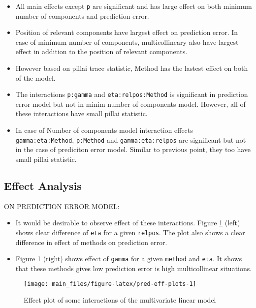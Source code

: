 \documentclass[12pt,3p,authoryear]{elsarticle}
\providecommand{\tightlist}{%
  \setlength{\itemsep}{0pt}\setlength{\parskip}{0pt}}
\theoremstyle{definition}
\theoremstyle{definition}
\theoremstyle{definition}
\theoremstyle{remark}
\begin{document}
\begin{itemize}
\tightlist
\item
  All main effects except \texttt{p} are significant and has large
  effect on both minimum number of components and prediction error.
\item
  Position of relevant components have largest effect on prediction
  error. In case of minimum number of components, multicollineary also
  have largest effect in addition to the position of relevant
  components.
\item
  However based on pillai trace statistic, Method has the lastest effect
  on both of the model.
\item
  The interactions \texttt{p:gamma} and \texttt{eta:relpos:Method} is
  significant in prediction error model but not in minim number of
  components model. However, all of these interactions have small pillai
  statistic.
\item
  In case of Number of components model interaction effects
  \texttt{gamma:eta:Method}, \texttt{p:Method} and
  \texttt{gamma:eta:relpos} are significant but not in the case of
  prediciton error model. Similar to previous point, they too have small
  pillai statistic.
\end{itemize}

\subsection{Effect Analysis}\label{effect-analysis}

ON PREDICTION ERROR MODEL:

\begin{itemize}
\tightlist
\item
  It would be desirable to observe effect of these interactions. Figure
  \ref{fig:pred-eff-plots} (left) shows clear difference of \texttt{eta}
  for a given \texttt{relpos}. The plot also shows a clear difference in
  effect of methods on prediction error.
\item
  Figure \ref{fig:pred-eff-plots} (right) shows effect of \texttt{gamma}
  for a given \texttt{method} and \texttt{eta}. It shows that these
  methods gives low prediction error is high multicollinear situations.
\end{itemize}

\begin{figure}
\texttt{[image: main\_files/figure-latex/pred-eff-plots-1]} \caption{Effect plot of some interactions of the multivariate linear model}\label{fig:pred-eff-plots}
\end{figure}
\end{document}

